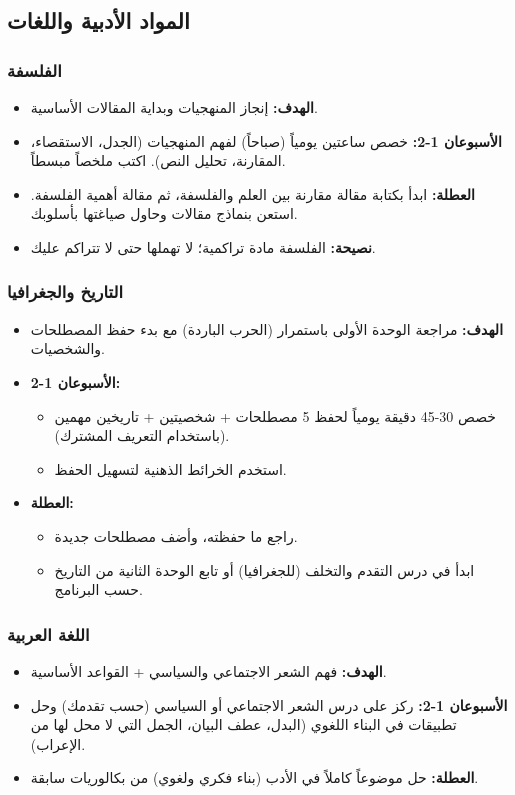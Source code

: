\documentclass[12pt,a4paper]{book}
\begin{document}
\subsection{المواد الأدبية واللغات}

\subsubsection*{الفلسفة}
\begin{itemize}
	\item \textbf{الهدف:} إنجاز المنهجيات وبداية المقالات الأساسية.
	\item \textbf{الأسبوعان 1-2:} خصص ساعتين يومياً (صباحاً) لفهم المنهجيات (الجدل، الاستقصاء، المقارنة، تحليل النص). اكتب ملخصاً مبسطاً.
	\item \textbf{العطلة:} ابدأ بكتابة مقالة مقارنة بين العلم والفلسفة، ثم مقالة أهمية الفلسفة. استعن بنماذج مقالات وحاول صياغتها بأسلوبك.
	\item \textbf{نصيحة:} الفلسفة مادة تراكمية؛ لا تهملها حتى لا تتراكم عليك.
\end{itemize}

\subsubsection*{التاريخ والجغرافيا}
\begin{itemize}
	\item \textbf{الهدف:} مراجعة الوحدة الأولى باستمرار (الحرب الباردة) مع بدء حفظ المصطلحات والشخصيات.
	\item \textbf{الأسبوعان 1-2:} 
	\begin{itemize}
		\item خصص 30-45 دقيقة يومياً لحفظ 5 مصطلحات + شخصيتين + تاريخين مهمين (باستخدام التعريف المشترك).
		\item استخدم الخرائط الذهنية لتسهيل الحفظ.
	\end{itemize}
	\item \textbf{العطلة:} 
	\begin{itemize}
		\item راجع ما حفظته، وأضف مصطلحات جديدة.
		\item ابدأ في درس التقدم والتخلف (للجغرافيا) أو تابع الوحدة الثانية من التاريخ حسب البرنامج.
	\end{itemize}
\end{itemize}

\subsubsection*{اللغة العربية}
\begin{itemize}
	\item \textbf{الهدف:} فهم الشعر الاجتماعي والسياسي + القواعد الأساسية.
	\item \textbf{الأسبوعان 1-2:} ركز على درس الشعر الاجتماعي أو السياسي (حسب تقدمك) وحل تطبيقات في البناء اللغوي (البدل، عطف البيان، الجمل التي لا محل لها من الإعراب).
	\item \textbf{العطلة:} حل موضوعاً كاملاً في الأدب (بناء فكري ولغوي) من بكالوريات سابقة.
\end{itemize}
\end{document}
